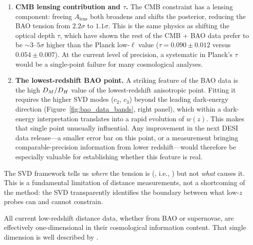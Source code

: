 \begin{enumerate}
\item \textbf{CMB lensing contribution and $\tau$.} The CMB \omh constraint has a lensing component: freeing $A_\mathrm{lens}$ both broadens and shifts the \omh posterior, reducing the BAO \czero tension from $2.2\sigma$ to $1.1\sigma$. This is the same physics as shifting the optical depth $\tau$, which \citet{Sailer2026} have shown the rest of the CMB + BAO data prefer to be $\sim 3$--$5\sigma$ higher than the Planck low-$\ell$ value ($\tau = 0.090 \pm 0.012$ versus $0.054 \pm 0.007$). At the current level of precision, a systematic in Planck's $\tau$ would be a single-point failure for many cosmological analyses.

\item \textbf{The lowest-redshift BAO point.} A striking feature of the BAO data is the high $D_M/D_H$ value of the lowest-redshift anisotropic point. Fitting it requires the higher SVD modes ($c_2$, $c_3$) beyond the leading dark-energy direction (Figure~\ref{fig:bao_data_bands}, right panel), which within a dark-energy interpretation translates into a rapid evolution of $w(z)$. This makes that single point unusually influential. Any improvement in the next DESI data release---a smaller error bar on this point, or a measurement bringing comparable-precision information from lower redshift---would therefore be especially valuable for establishing whether this feature is real.

\end{enumerate}

The SVD framework tells us \emph{where} the tension is (\czero, i.e., \omh) but not \emph{what} causes it. This is a fundamental limitation of distance measurements, not a shortcoming of the method: the SVD transparently identifies the boundary between what low-$z$ probes can and cannot constrain.

All current low-redshift distance data, whether from BAO or supernovae, are effectively one-dimensional in their cosmological information content. That single dimension is well described by \omh.
